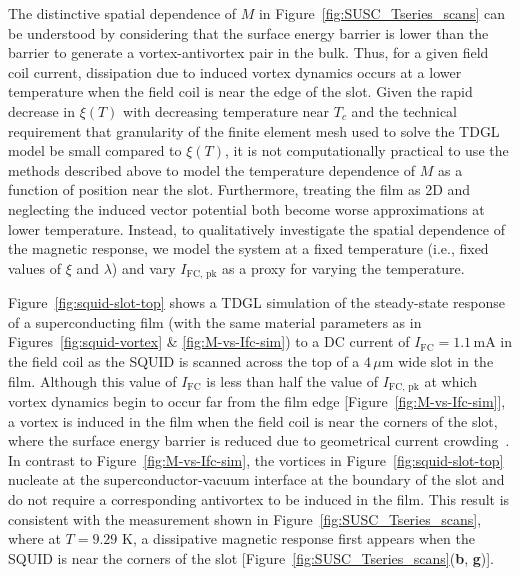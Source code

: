\documentclass[%
 reprint,
 superscriptaddress,
 amsmath,
 amssymb,
 amsfonts,
 aps,
 prb,
]{revtex4-2}
\newcommand{\Tc}{T_c}
\newcommand{\FC}{\mathrm{FC}}
\newcommand{\pk}{\mathrm{pk}}
\newcommand{\mA}{\mathrm{mA}}
\newcommand{\um}{\mu\mathrm{m}}
\begin{document}
The distinctive spatial dependence of $M$ in Figure~\ref{fig:SUSC_Tseries_scans} can be understood by considering that the surface energy barrier is lower than the barrier to generate a vortex-antivortex pair in the bulk. Thus, for a given field coil current, dissipation due to induced vortex dynamics occurs at a lower temperature when the field coil is near the edge of the slot. Given the rapid decrease in $\xi(T)$ with decreasing temperature near $\Tc$ and the technical requirement that granularity of the finite element mesh used to solve the TDGL model be small compared to $\xi(T)$, it is not computationally practical to use the methods described above to model the temperature dependence of $M$ as a function of position near the slot. Furthermore, treating the film as 2D and neglecting the induced vector potential both become worse approximations at lower temperature. Instead, to qualitatively investigate the spatial dependence of the magnetic response, we model the system at a fixed temperature (i.e., fixed values of $\xi$ and $\lambda$) and vary $I_{\FC,\,\pk}$ as a proxy for varying the temperature.

Figure~\ref{fig:squid-slot-top} shows a TDGL simulation of the steady-state response of a superconducting film (with the same material parameters as in Figures~\ref{fig:squid-vortex} \& \ref{fig:M-vs-Ifc-sim}) to a DC current of $I_\mathrm{FC}=1.1\,\mA$ in the field coil as the SQUID is scanned across the top of a $4\,\um$ wide slot in the film. Although this value of $I_{\FC}$ is less than half the value of $I_{\FC,\,\pk}$ at which vortex dynamics begin to occur far from the film edge [Figure~\ref{fig:M-vs-Ifc-sim}], a vortex is induced in the film when the field coil is near the corners of the slot, where the surface energy barrier is reduced due to geometrical current crowding~\cite{Clem2011-ji}. In contrast to Figure~\ref{fig:M-vs-Ifc-sim}, the vortices in Figure~\ref{fig:squid-slot-top} nucleate at the superconductor-vacuum interface at the boundary of the slot and do not require a corresponding antivortex to be induced in the film. This result is consistent with the measurement shown in Figure~\ref{fig:SUSC_Tseries_scans}, where at $T=9.29$ K, a dissipative magnetic response first appears when the SQUID is near the corners of the slot [Figure~\ref{fig:SUSC_Tseries_scans}({\bf b}, {\bf g})].
\end{document}
